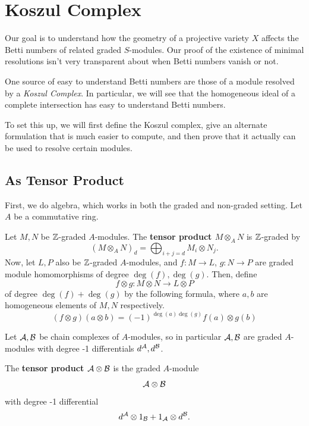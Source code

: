 \documentclass[12pt]{article}
\begin{document}
\section{Koszul Complex}

Our goal is to understand how the geometry of a projective variety $X$ affects the Betti numbers of related graded $S$-modules. Our proof of the existence of minimal resolutions isn't very transparent about when Betti numbers vanish or not.

One source of easy to understand Betti numbers are those of a module resolved by a \textit{Koszul Complex}. In particular, we will see that the homogeneous ideal of a complete intersection has easy to understand Betti numbers.

To set this up, we will first define the Koszul complex, give an alternate formulation that is much easier to compute, and then prove that it actually can be used to resolve certain modules.

\subsection{As Tensor Product}

First, we do algebra, which works in both the graded and non-graded setting. Let $A$ be a commutative ring.

\begin{defn}
    Let $M,N$ be $\mathbb{Z}$-graded $A$-modules. The \textbf{tensor product $M\otimes_A N$} is $\mathbb{Z}$-graded by
    \[(M\otimes_A N)_d = \bigoplus_{i+j=d} M_i \otimes N_j.\]
    Now, let $L,P$ also be $\mathbb{Z}$-graded $A$-modules, and $f: M\to L$, $g: N\to P$ are graded module homomorphisms of degree $\deg(f), \deg(g)$. Then, define
    \[f\otimes g: M\otimes N \to L\otimes P\]
    of degree $\deg(f)+\deg(g)$ by the following formula, where $a,b$ are homogeneous elements of $M,N$ respectively.
    \[(f\otimes g)(a\otimes b) = (-1)^{\deg(a)\deg(g)}f(a)\otimes g(b)\]
\end{defn}

\begin{defn}
    Let $\mathcal{A}, \mathcal{B}$ be chain complexes of $A$-modules, so in particular $\mathcal{A},\mathcal{B}$ are graded $A$-modules with degree -1 differentials $d^{\mathcal{A}},d^{\mathcal{B}}$.
    
    The \textbf{tensor product $\mathcal{A} \otimes \mathcal{B}$} is the graded $A$-module
    \[\mathcal{A} \otimes \mathcal{B}\]
    with degree -1 differential
    \[d^{\mathcal{A}} \otimes 1_{\mathcal{B}} + 1_{\mathcal{A}} \otimes d^{\mathcal{B}}.\]
\end{defn}
\end{document}
